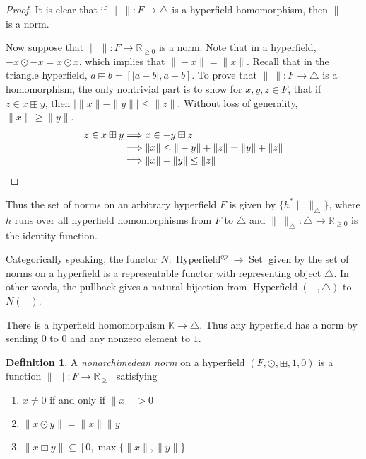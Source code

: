 \documentclass[10pt, preprint]{article}
\theoremstyle{definition}
\newtheorem{definition}[theorem]{Definition}
\begin{document}
\begin{proof}
It is clear that if $\|~\| : F \to \triangle $ is a hyperfield
homomorphism, then $\|~\|$ is a norm.

Now suppose that $\|~\| : F \to \mathbb{R}_{\geq 0}$ is a norm. Note
that in a hyperfield, $-x \odot -x = x \odot x$, which implies that
$\|-x\| = \|x\|$. Recall that in the triangle hyperfield, $a \boxplus
b = [|a-b|, a + b]$. To prove that $\|~\| : F \to \triangle $ is a
homomorphism, the only nontrivial part is to show for $x,y,z \in F$,
that if $z \in x \boxplus y $, then $\vert \|x \| - \|y\| \vert \leq \|z\|$.
Without loss of generality, $ \|x \| \geq \|y\| $.\vspace*{-2pt}
%
\begin{align*}
z \in x \boxplus y
& \Longrightarrow x \in -y \boxplus z
\\[-2pt]
& \Longrightarrow \|x\| \leq \|-y\| + \|z\| = \|y\| + \|z\|
\\[-2pt]
& \Longrightarrow \|x\| - \|y\| \leq \|z\|\qedhere
\end{align*}
%
\end{proof}

Thus the set of norms on an arbitrary hyperfield $F$ is given by
$\{ {h^{*}\|~\|_{\triangle }}\}$, where $h$ runs over all hyperfield
homomorphisms from $F$ to $\triangle $ and $\|~\|_{\triangle } :
\triangle \to \mathbb{R}_{\geq 0}$ is the identity function.

Categorically speaking, the functor $N : \operatorname{Hyperfield}
^{op} \to \operatorname{Set}$ given by the set of norms on a hyperfield
is a representable functor with representing object $\triangle $. In
other words, the pullback gives a natural bijection from $
\operatorname{Hyperfield}(-,\triangle )$ to $N(-)$.

There is a hyperfield homomorphism $\mathbb{K}\to \triangle $. Thus any
hyperfield has a norm by sending $0$ to $0$ and any nonzero element to
$1$.\vspace*{-2pt}

\begin{definition}
A \emph{nonarchimedean norm} on a hyperfield $(F, \odot , \boxplus , 1,
0)$ is a function $\|~\| : F \to \mathbb{R}_{\geq 0}$ satisfying\vspace*{-2pt}
%
\begin{enumerate}%
\item
$x \neq 0$ if and only if $\|x\|>0$
%
\item
$\|x \odot y\| = \|x\|\|y\|$
%
\item
$\|x \boxplus y\| \subseteq [0, \max \{\|x\|, \|y\|\}]$\vspace*{-2pt}
\end{enumerate}
%
\end{definition}
\end{document}
